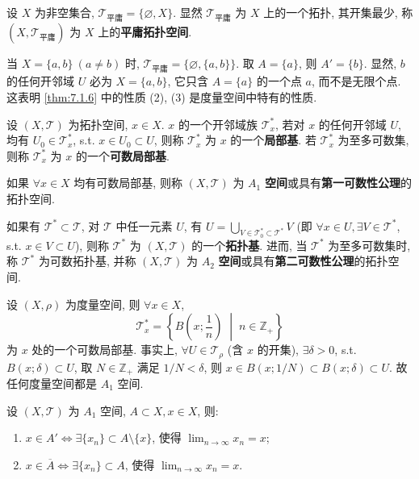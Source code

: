 \begin{example}\label{ex:7.1.1}
设 $X$ 为非空集合, $\mathcal{T}_{\text{平庸}} = \{\varnothing, X\}$. 显然 $\mathcal{T}_{\text{平庸}}$ 为 $X$ 上的一个拓扑, 其开集最少, 称 $(X, \mathcal{T}_{\text{平庸}})$ 为 $X$ 上的\textbf{平庸拓扑空间}.

当 $X = \{a, b\}\ (a \neq b)$ 时, $\mathcal{T}_{\text{平庸}} = \{\varnothing, \{a, b\}\}$. 取 $A = \{a\}$, 则 $A' = \{b\}$. 显然, $b$ 的任何开邻域 $U$ 必为 $X = \{a, b\}$, 它只含 $A = \{a\}$ 的一个点 $a$, 而不是无限个点. 这表明 \cref{thm:7.1.6} 中的性质 (2), (3) 是度量空间中特有的性质.
\end{example}

\begin{definition}\label{def:7.1.5}
设 $(X, \mathcal{T})$ 为拓扑空间, $x \in X$. $x$ 的一个开邻域族 $\mathcal{T}_x^*$, 若对 $x$ 的任何开邻域 $U$, 均有 $U_0 \in \mathcal{T}_x^*$, s.t. $x \in U_0 \subset U$, 则称 $\mathcal{T}_x^*$ 为 $x$ 的一个\textbf{局部基}. 若 $\mathcal{T}_x^*$ 为至多可数集, 则称 $\mathcal{T}_x^*$ 为 $x$ 的一个\textbf{可数局部基}.

如果 $\forall x \in X$ 均有可数局部基, 则称 $(X, \mathcal{T})$ 为 $A_1$ \textbf{空间}或具有\textbf{第一可数性公理}的拓扑空间.

如果有 $\mathcal{T}^* \subset \mathcal{T}$, 对 $\mathcal{T}$ 中任一元素 $U$, 有 $U = \bigcup_{V \in \mathcal{T}_0^* \subset \mathcal{T}^*} V$ (即 $\forall x \in U, \exists V \in \mathcal{T}^*$, s.t. $x \in V \subset U$), 则称 $\mathcal{T}^*$ 为 $(X, \mathcal{T})$ 的一个\textbf{拓扑基}. 进而, 当 $\mathcal{T}^*$ 为至多可数集时, 称 $\mathcal{T}^*$ 为可数拓扑基, 并称 $(X, \mathcal{T})$ 为 $A_2$ \textbf{空间}或具有\textbf{第二可数性公理}的拓扑空间.
\end{definition}

\begin{example}\label{ex:7.1.2}
设 $(X, \rho)$ 为度量空间, 则 $\forall x \in X$,
\[
  \mathcal{T}_x^* = \left\{B\left(x; \frac{1}{n}\right) \;\middle|\; n \in \mathbb{Z}_+\right\}
\]
为 $x$ 处的一个可数局部基. 事实上, $\forall U \in \mathcal{T}_\rho$ (含 $x$ 的开集), $\exists \delta > 0$, s.t. $B(x; \delta) \subset U$, 取 $N \in \mathbb{Z}_+$ 满足 $1/N < \delta$, 则 $x \in B(x; 1/N) \subset B(x; \delta) \subset U$. 故任何度量空间都是 $A_1$ 空间.
\end{example}

\begin{theorem}\label{thm:7.1.7}
设 $(X, \mathcal{T})$ 为 $A_1$ 空间, $A \subset X, x \in X$, 则:
\begin{enumerate}
  \item $x \in A' \iff \exists \{x_n\} \subset A \setminus \{x\}$, 使得 $\lim_{n \to \infty} x_n = x$;
  \item $x \in \overline{A} \iff \exists \{x_n\} \subset A$, 使得 $\lim_{n \to \infty} x_n = x$.
\end{enumerate}
\end{theorem}

